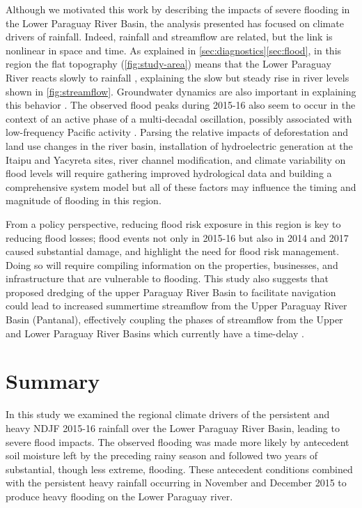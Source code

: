 \documentclass[twocol]{ametsoc}
\begin{document}
Although we motivated this work by describing the impacts of severe flooding in the Lower Paraguay River Basin, the analysis presented has focused on climate drivers of rainfall.
Indeed, rainfall and streamflow are related, but the link is nonlinear in space and time.
As explained in \cref{sec:diagnostics}\ref{sec:flood}, in this region the flat topography (\cref{fig:study-area}) means that the Lower Paraguay River reacts slowly to rainfall \citep{Bravo:2011et,Barros:2004bn}, explaining the slow but steady rise in river levels shown in \cref{fig:streamflow}.
Groundwater dynamics are also important in explaining this behavior \citep{Santos:2016td}.
The observed flood peaks during 2015-16 also seem to occur in the context of an active phase of a multi-decadal oscillation, possibly associated with low-frequency Pacific activity \citep{Collischonn:2001bi,Huang:2005ir}.
Parsing the relative impacts of deforestation and land use changes in the river basin, installation of hydroelectric generation at the Itaipu and Yacyreta sites, river channel modification, and climate variability on flood levels will require gathering improved hydrological data and building a comprehensive system model but all of these factors may influence the timing and magnitude of flooding in this region.

From a policy perspective, reducing flood risk exposure in this region is key to reducing flood losses; flood events not only in 2015-16 but also in 2014 and 2017 caused substantial damage, and highlight the need for flood risk management.
Doing so will require compiling information on the properties, businesses, and infrastructure that are vulnerable to flooding.
This study also suggests that proposed dredging of the upper Paraguay River Basin to facilitate navigation could lead to increased summertime streamflow from the Upper Paraguay River Basin (Pantanal), effectively coupling the phases of streamflow from the Upper and Lower Paraguay River Basins which currently have a time-delay \citep{Bravo:2011et}.


\section{Summary} \label{sec:summary}

In this study we examined the regional climate drivers of the persistent and heavy NDJF 2015-16 rainfall over the Lower Paraguay River Basin, leading to severe flood impacts.
The observed flooding was made more likely by antecedent soil moisture left by the preceding rainy season and followed two years of substantial, though less extreme, flooding.
These antecedent conditions combined with the persistent heavy rainfall occurring in November and December 2015 to produce heavy flooding on the Lower Paraguay river.
\end{document}
